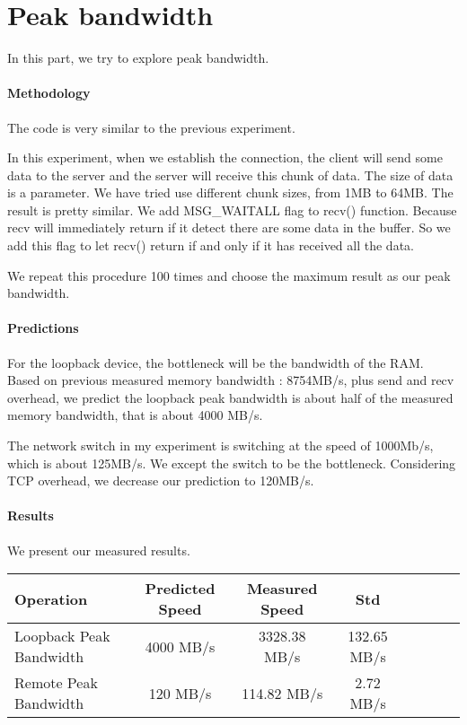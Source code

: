 \section{Peak bandwidth}
In this part, we try to explore peak bandwidth.

\paragraph{Methodology}
The code is very similar to the previous experiment.

In this experiment, when we establish the connection, the client will send some data to the server and the server will receive this chunk of data. The size of data is a parameter. We have tried use different chunk sizes,  from 1MB to 64MB. The result is pretty similar. We add MSG\_WAITALL flag to recv() function. Because recv will immediately return if it detect there are some data in the buffer. So we add this flag to let recv() return if and only if it has received all the data.

We repeat this procedure 100 times and choose the maximum result as our peak bandwidth.

\paragraph{Predictions}
For the loopback device, the bottleneck will be the bandwidth of the RAM. Based on previous measured memory bandwidth : 8754MB/s, plus send and recv overhead, we predict the loopback peak bandwidth is about half of the measured memory bandwidth, that is about 4000 MB/s.

The network switch in my experiment is switching at the speed of 1000Mb/s, which is about 125MB/s. We except the switch to be the bottleneck. Considering TCP overhead, we decrease our prediction to 120MB/s.

\paragraph{Results}
We present our measured results.

\begin{center}
\begin{tabular}{l*{6}{c}r}
Operation       &  Predicted Speed& Measured Speed & Std\\
\hline
Loopback Peak Bandwidth & 4000 MB/s & 3328.38 MB/s & 132.65 MB/s\\
Remote Peak Bandwidth & 120 MB/s  & 114.82 MB/s & 2.72 MB/s\\
\end{tabular}
\end{center}


